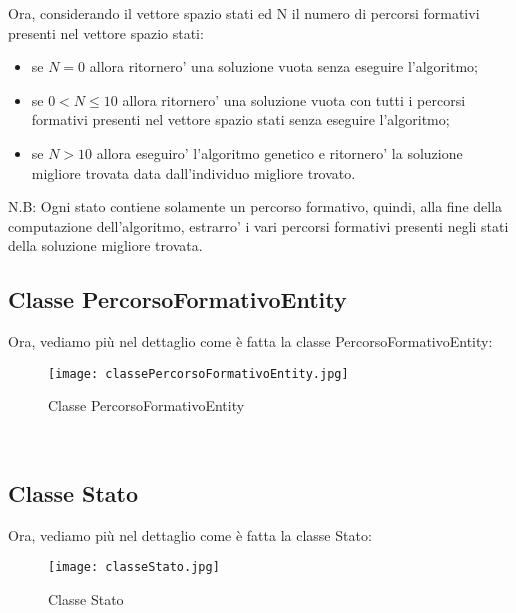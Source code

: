 \documentclass[10pt,a4paper]{article}
\begin{document}
      Ora, considerando il vettore spazio stati ed N il numero di percorsi formativi presenti nel vettore spazio stati:\\
      \begin{itemize}
        \item se $ N = 0 $ allora ritornero' una soluzione vuota senza eseguire l'algoritmo;
        \item se $ 0 < N \leq 10 $ allora ritornero' una soluzione vuota con tutti i percorsi formativi presenti nel vettore spazio stati 
        senza eseguire l'algoritmo;
        \item se $ N > 10 $ allora eseguiro' l'algoritmo genetico e ritornero' la soluzione migliore trovata data dall'individuo migliore trovato.
      \end{itemize}
      N.B: Ogni stato contiene solamente un percorso formativo, quindi, alla fine della computazione dell'algoritmo, estrarro' 
      i vari percorsi formativi presenti negli stati della soluzione migliore trovata.
     
     \subsection{Classe PercorsoFormativoEntity}
       \label{classePercorsoFormativoEntitySubsection}
       Ora, vediamo più nel dettaglio come è fatta la classe PercorsoFormativoEntity:\\
       \begin{figure}[h!]
         \centering
         \caption{Classe PercorsoFormativoEntity}
         \texttt{[image: classePercorsoFormativoEntity.jpg]}
         \label{classePercorsoFormativoEntity}
       \end{figure}\\
      
     \subsection{Classe Stato}
       \label{classeStatoSubsection}
       Ora, vediamo più nel dettaglio come è fatta la classe Stato:\\
       \begin{figure}[h!]
         \centering
         \caption{Classe Stato}
         \texttt{[image: classeStato.jpg]}
         \label{classeStato}
       \end{figure}\\
      
\end{document}
